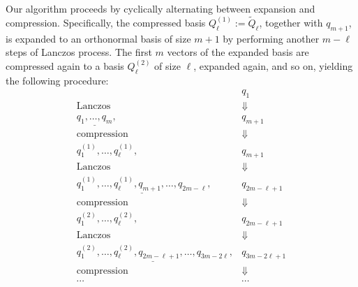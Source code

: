 \documentclass{siamart190516}
\begin{document}
Our algorithm proceeds by cyclically alternating between expansion and compression. Specifically, the compressed basis ${Q}^{(1)}_{\ell} := \widetilde{Q}_{\ell}$, together with $q_{m+1}$, is expanded to an orthonormal basis of size $m+1$ by performing another $m-\ell$ steps of Lanczos process. 
The first $m$ vectors of the expanded basis are compressed again to a basis ${Q}^{(2)}_{\ell}$ of size $\ell$, expanded again, and so on, yielding the following procedure:
\begin{equation}
    \label{eq:compression}
    \begin{aligned}
        &q_{1}\\ 
        \text{Lanczos}\quad&\Downarrow\\ 
        \underline{q_{1},\dotsc,q_{m}},&q_{m+1}\\ 
        \text{compression}\quad&\Downarrow\\ 
        q_{1}^{(1)},\dotsc,q_{\ell}^{(1)},&q_{m+1}\\ 
        \text{Lanczos}\quad&\Downarrow\\ 
        \underline{q_{1}^{(1)},\dotsc,q_{\ell}^{(1)},q_{m+1},\dotsc,q_{2m-\ell}},&q_{2m-\ell+1}\\ 
        \text{compression}\quad&\Downarrow\\
        q_{1}^{(2)},\dotsc,q_{\ell}^{(2)},&q_{2m-\ell+1}\\ 
        \text{Lanczos}\quad&\Downarrow\\ 
        \underline{q_{1}^{(2)},\dotsc,q_{\ell}^{(2)},q_{2m-\ell+1},\dotsc,q_{3m-2\ell}},&q_{3m-2\ell+1}\\ 
        \text{compression}\quad&\Downarrow\\
        \cdots & \cdots
    \end{aligned}
\end{equation}
\end{document}
